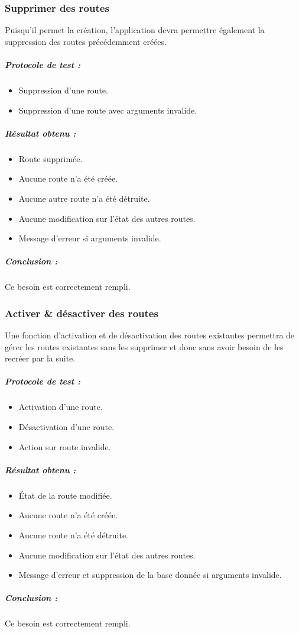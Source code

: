 \subsubsection{Supprimer des routes}
Puisqu'il permet la création, l'application devra permettre également la suppression des routes précédemment créées.
\subparagraph{Protocole de test :}
\begin{itemize}
    \item Suppression d'une route.
    \item Suppression d'une route avec arguments invalide.
\end{itemize}
\subparagraph{Résultat obtenu :}
    \begin{itemize}
    \item Route supprimée.
    \item Aucune route n'a été créée.
    \item Aucune autre route n'a été détruite.
    \item Aucune modification sur l'état des autres routes.
    \item Message d'erreur si arguments invalide.
\end{itemize}
\subparagraph{Conclusion :}Ce besoin est correctement rempli.

\subsubsection{Activer \& désactiver des routes}
Une fonction d'activation et de désactivation des routes existantes permettra de gérer les routes existantes sans les supprimer et donc sans avoir besoin de les recréer par la suite.
\subparagraph{Protocole de test :}
\begin{itemize}
    \item Activation d'une route.
    \item Désactivation d'une route.
    \item Action sur route invalide.
\end{itemize}
\subparagraph{Résultat obtenu :}
    \begin{itemize}
    \item État de la route modifiée.
    \item Aucune route n'a été créée.
    \item Aucune route n'a été détruite.
    \item Aucune modification sur l'état des autres routes.
    \item Message d'erreur et suppression de la base donnée si arguments invalide.
\end{itemize}
\subparagraph{Conclusion :}Ce besoin est correctement rempli.

